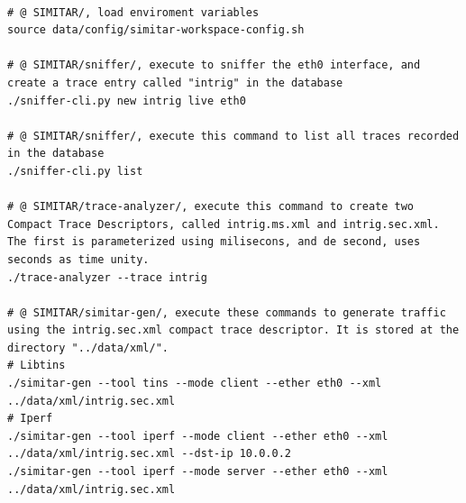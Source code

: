 \begin{verbatim}

# @ SIMITAR/, load enviroment variables
source data/config/simitar-workspace-config.sh

# @ SIMITAR/sniffer/, execute to sniffer the eth0 interface, and create a trace entry called "intrig" in the database
./sniffer-cli.py new intrig live eth0

# @ SIMITAR/sniffer/, execute this command to list all traces recorded in the database
./sniffer-cli.py list

# @ SIMITAR/trace-analyzer/, execute this command to create two Compact Trace Descriptors, called intrig.ms.xml and intrig.sec.xml. The first is parameterized using milisecons, and de second, uses seconds as time unity.
./trace-analyzer --trace intrig

# @ SIMITAR/simitar-gen/, execute these commands to generate traffic using the intrig.sec.xml compact trace descriptor. It is stored at the directory "../data/xml/". 
# Libtins
./simitar-gen --tool tins --mode client --ether eth0 --xml ../data/xml/intrig.sec.xml 
# Iperf
./simitar-gen --tool iperf --mode client --ether eth0 --xml ../data/xml/intrig.sec.xml --dst-ip 10.0.0.2
./simitar-gen --tool iperf --mode server --ether eth0 --xml ../data/xml/intrig.sec.xml

\end{verbatim}


